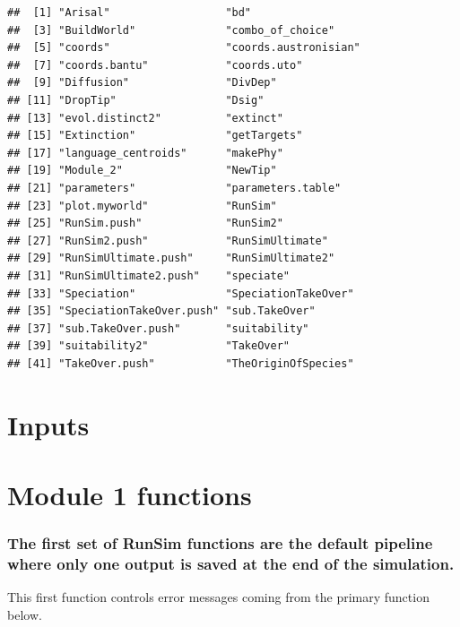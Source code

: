 \documentclass[]{book}
\theoremstyle{definition}
\theoremstyle{definition}
\theoremstyle{remark}
\begin{document}
\begin{verbatim}
##  [1] "Arisal"                  "bd"                     
##  [3] "BuildWorld"              "combo_of_choice"        
##  [5] "coords"                  "coords.austronisian"    
##  [7] "coords.bantu"            "coords.uto"             
##  [9] "Diffusion"               "DivDep"                 
## [11] "DropTip"                 "Dsig"                   
## [13] "evol.distinct2"          "extinct"                
## [15] "Extinction"              "getTargets"             
## [17] "language_centroids"      "makePhy"                
## [19] "Module_2"                "NewTip"                 
## [21] "parameters"              "parameters.table"       
## [23] "plot.myworld"            "RunSim"                 
## [25] "RunSim.push"             "RunSim2"                
## [27] "RunSim2.push"            "RunSimUltimate"         
## [29] "RunSimUltimate.push"     "RunSimUltimate2"        
## [31] "RunSimUltimate2.push"    "speciate"               
## [33] "Speciation"              "SpeciationTakeOver"     
## [35] "SpeciationTakeOver.push" "sub.TakeOver"           
## [37] "sub.TakeOver.push"       "suitability"            
## [39] "suitability2"            "TakeOver"               
## [41] "TakeOver.push"           "TheOriginOfSpecies"
\end{verbatim}

\section{Inputs}\label{inputs}

\section{Module 1 functions}\label{module-1-functions}

\subsubsection{The first set of RunSim functions are the default
pipeline where only one output is saved at the end of the
simulation.}\label{the-first-set-of-runsim-functions-are-the-default-pipeline-where-only-one-output-is-saved-at-the-end-of-the-simulation.}

This first function controls error messages coming from the primary
function below.
\end{document}
